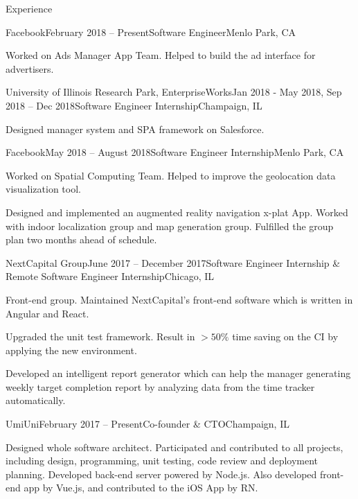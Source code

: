 \documentclass{resume} %
\begin{document}
\begin{rSection}{Experience}

\begin{rSubsection}{Facebook}{February 2018 -- Present}{Software Engineer}{Menlo Park, CA}
\item Worked on Ads Manager App Team. Helped to build the ad interface for advertisers.
\end{rSubsection}

\begin{rSubsection}{University of Illinois Research Park, EnterpriseWorks}{Jan 2018 - May 2018, Sep 2018 -- Dec 2018}{Software Engineer Internship}{Champaign, IL}
\item Designed manager system and SPA framework on Salesforce.
\end{rSubsection}

\begin{rSubsection}{Facebook}{May 2018 -- August 2018}{Software Engineer Internship}{Menlo Park, CA}
\item Worked on Spatial Computing Team. Helped to improve the geolocation data visualization tool.
\item Designed and implemented an augmented reality navigation x-plat App. Worked with indoor localization group and map generation group. Fulfilled the group plan two months ahead of schedule.
\end{rSubsection}

\begin{rSubsection}{NextCapital Group}{June 2017 -- December 2017}{Software Engineer Internship \& Remote Software Engineer Internship}{Chicago, IL}

\item Front-end group. Maintained NextCapital's front-end software which is written in Angular and React.
\item Upgraded the unit test framework. Result in $>50\%$ time saving on the CI by applying the new environment.
\item Developed an intelligent report generator which can help the manager generating weekly target completion report by analyzing data from the time tracker automatically.

\end{rSubsection}

\begin{rSubsection}{UmiUni}{February 2017 -- Present}{Co-founder \& CTO}{Champaign, IL}

\item Designed whole software architect. Participated and contributed to all projects, including design, programming, unit testing, code review and deployment planning. Developed back-end server powered by Node.js. Also developed front-end app by Vue.js, and contributed to the iOS App by RN.


\end{rSubsection}
\end{rSection}
\end{document}
